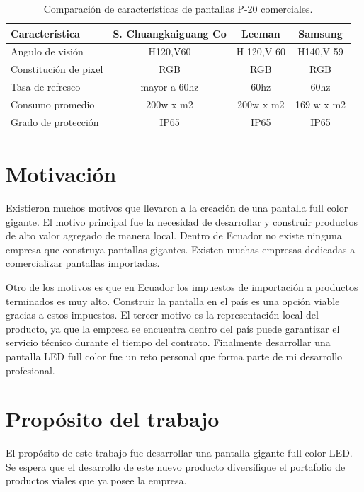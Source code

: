 \begin{table}[h]
\centering
\caption[Comparación entre pantallas P-20]{Comparación de características de pantallas P-20 comerciales.}
\begin{tabular}{l c c c}
\toprule
\textbf{Característica} & \textbf{S. Chuangkaiguang Co \citep{TABLAREF1}} & \textbf{Leeman \citep{TABLAREF2}} & \textbf{Samsung \citep{TABLAREF3}} \\
\midrule 

Angulo de visión        & H120,V60 & H 120,V 60 & H140,V 59 \\
Constitución de pixel   & RGB & RGB & RGB \\
Tasa de refresco        & mayor a 60hz & 60hz & 60hz \\
Consumo promedio        & 200w x m2 & 200w x m2 & 169 w x m2 \\
Grado de protección     & IP65 & IP65 & IP65 \\

\bottomrule
\hline
\end{tabular}
\label{tab:comercial}
\end{table}





\section{Motivación}
Existieron muchos motivos que llevaron a la creación de una pantalla full color gigante. El motivo principal fue la necesidad de desarrollar y construir productos de alto valor agregado de manera local. Dentro de Ecuador no existe ninguna empresa que construya pantallas gigantes. Existen muchas empresas dedicadas a comercializar pantallas importadas. 

Otro de los motivos es que en Ecuador los impuestos de importación a productos terminados es muy alto. Construir la pantalla en el país es una opción viable gracias a estos impuestos. El tercer motivo es la representación local del producto, ya que la empresa se encuentra dentro del país puede garantizar el servicio técnico durante el tiempo del contrato. Finalmente desarrollar una pantalla LED full color fue un reto personal que forma parte de mi desarrollo profesional. 



\section{Propósito del trabajo}
El propósito de este trabajo fue desarrollar una pantalla gigante full color LED. Se espera que el desarrollo de este nuevo producto diversifique el portafolio de productos viales que ya posee la empresa.

